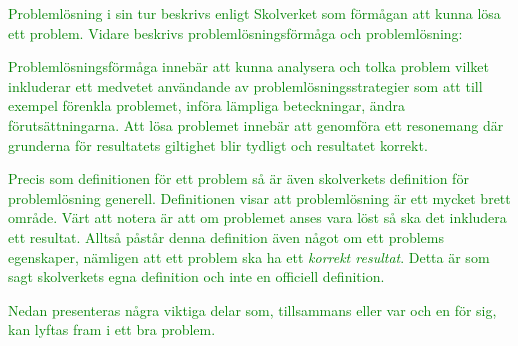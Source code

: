 \textcolor{green}{Problemlösning i sin tur beskrivs enligt Skolverket som förmågan att kunna lösa ett problem. Vidare beskrivs problemlösningsförmåga och problemlösning:}



\begin{displayquote}
\textcolor{green}{Problemlösningsförmåga innebär att kunna analysera och tolka problem vilket inkluderar ett medvetet användande av problemlösningsstrategier som att till exempel förenkla problemet, införa lämpliga beteckningar, ändra förutsättningarna. Att lösa problemet innebär att genomföra ett resonemang där grunderna för resultatets giltighet blir tydligt och resultatet korrekt.}
\end{displayquote}

\noindent \textcolor{green}{Precis som definitionen för ett problem så är även skolverkets definition för problemlösning generell. Definitionen visar att problemlösning är ett mycket brett område.
Värt att notera är att om problemet anses vara löst så ska det inkludera ett resultat. Alltså påstår denna definition även något om ett problems egenskaper, nämligen att ett problem ska ha ett \textsl{korrekt resultat}. Detta är som sagt skolverkets egna definition och inte en officiell definition.}

\textcolor{green}{
Nedan presenteras några viktiga delar som, tillsammans eller var och en för sig, kan lyftas fram i ett bra problem.}

